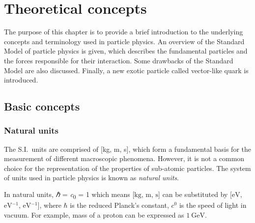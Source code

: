 


\chapter{Theoretical concepts}
\label{sec:theory}

The purpose of this chapter is to provide a brief introduction to the underlying concepts and terminology used in particle physics. An overview of the Standard Model of particle physics is given, which describes the fundamental particles and the forces responsible for their interaction. Some drawbacks of the Standard Model are also discussed. Finally, a new exotic particle called vector-like quark is introduced.
\section{Basic concepts}%
\label{sec:theory:basicconcepts}

\subsection*{Natural units}%
\label{sec:theory:basicconcepts:naturalunits}
The S.I.\ units are comprised of [\si{\kilogram}, \si{\metre}, \si{\second}], which form a fundamental basis for the measurement of different macroscopic phenomena. However, it is not a common choice for the representation of the properties of sub-atomic particles. The system of units used in particle physics is known as \textit{natural units}. 

In natural units, \si{\planckbar} = \si{\clight} = 1 which means [$\si{\kilogram}$, $\si{\metre}$, $\si{\second}$] can be substituted by [$\si{\electronvolt}$, $\si{\electronvolt^{-1}}$, $\si{\electronvolt^{-1}}$], where $\si{\planckbar}$ is the reduced Planck's constant, $\si{\clight}$ is the speed of light in vacuum. For example, mass of a proton can be expressed as $\SI{1}{\giga\electronvolt}$.~\cite{thomson}


